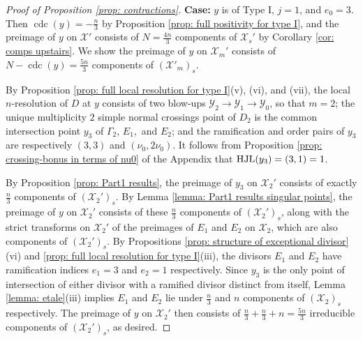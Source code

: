 \documentclass[12pt]{amsart}
\numberwithin{equation}{section}
\theoremstyle{definition}
\newcommand{\X}{\mathcal{X}}
\newcommand{\Y}{\mathcal{Y}}
\let\L\relax
\DeclareMathOperator{\cdc}{cdc}
\DeclareMathOperator{\HJL}{HJL}
\DeclareMathOperator{\L}{L}
\begin{document}
\begin{proof}[Proof of Proposition \ref{prop: contractions}]
    \textbf{Case:} $y$ is of Type I, $j=1$, and $e_0=3$. Then $\cdc(y)=-\frac{n}{3}$ by Proposition \ref{prop: full positivity for type I}, and the preimage of $y$ on $\X'$ consists of $N=\frac{4n}{3}$ components of $\X_s'$ by Corollary \ref{cor: comps upstairs}. We show the preimage of $y$ on $\X_m'$ consists of $N-\cdc(y)=\frac{5n}{3}$ components of $(\X'_m)_s$.

    By Proposition \ref{prop: full local resolution for type I}(v), (vi), and (vii), the local $n$-resolution of $D$ at $y$ consists of two blow-ups $\Y_2\to\Y_1\to\Y_0$, so that $m=2$; the unique multiplicity $2$ simple normal crossings point of $D_2$ is the common intersection point $y_3$ of $\Gamma_2$, $E_1,$ and $E_2$; and the ramification and order pairs of $y_3$ are respectively $(3,3)$ and $(\nu_0,2\nu_0)$. It follows from Proposition \ref{prop: crossing-bonus in terms of nu0} of the Appendix that $\HJL(y_3)=\L(3,1)=1$.

    By Proposition \ref{prop: Part1 results}, the preimage of $y_3$ on $\X_2'$ consists of exactly $\frac{n}{3}$ components of $(\X_2')_s$. %
    By Lemma \ref{lemma: Part1 results singular points}, the preimage of $y$ on $\X_2'$ consists of these $\frac{n}{3}$ components of $(\X_2')_s$, along with the strict transforms on $\X_2'$ of the preimages of $E_1$ and $E_2$ on $\X_2$, which are also components of $(\X_2')_s$. By Propositions \ref{prop: structure of exceptional divisor}(vi) and \ref{prop: full local resolution for type I}(iii), the divisors $E_1$ and $E_2$ have ramification indices $e_1=3$ and $e_2=1$ respectively. Since $y_3$ is the only point of intersection of either divisor with a ramified divisor distinct from itself, Lemma \ref{lemma: etale}(iii) implies $E_1$ and $E_2$ lie under $\frac{n}{3}$ and $n$ components of $(\X_2)_s$ respectively. The preimage of $y$ on $\X_2'$ then consists of $\frac{n}{3}+\frac{n}{3}+n=\frac{5n}{3}$ irreducible components of $(\X_2')_s$, as desired.


\end{proof}
\end{document}

